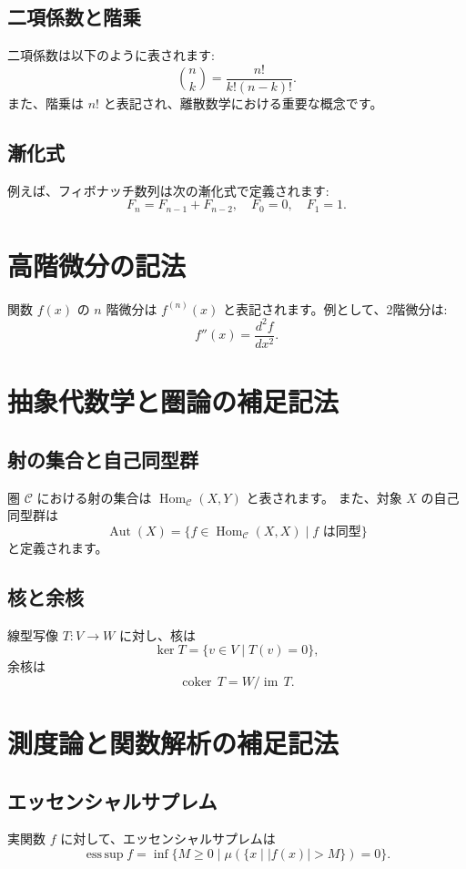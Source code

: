 \documentclass{ltjsarticle} %
\begin{document}
\subsection{二項係数と階乗}
二項係数は以下のように表されます:
\[
  \binom{n}{k} = \frac{n!}{k!(n-k)!}.
\]
また、階乗は \( n! \) と表記され、離散数学における重要な概念です。

\subsection{漸化式}
例えば、フィボナッチ数列は次の漸化式で定義されます:
\[
  F_n = F_{n-1} + F_{n-2}, \quad F_0 = 0,\quad F_1 = 1.
\]

\section{高階微分の記法}
関数 \( f(x) \) の \( n \) 階微分は \( f^{(n)}(x) \) と表記されます。例として、2階微分は:
\[
  f''(x) = \frac{d^2f}{dx^2}.
\]

\section{抽象代数学と圏論の補足記法}
\subsection{射の集合と自己同型群}
圏 \(\mathcal{C}\) における射の集合は \(\operatorname{Hom}_{\mathcal{C}}(X,Y)\) と表されます。  
また、対象 \( X \) の自己同型群は
\[
  \operatorname{Aut}(X) = \{ f \in \operatorname{Hom}_{\mathcal{C}}(X,X) \mid f \text{ は同型} \}
\]
と定義されます。

\subsection{核と余核}
線型写像 \( T: V \to W \) に対し、核は
\[
  \ker T = \{ v \in V \mid T(v) = 0 \},
\]
余核は
\[
  \operatorname{coker}\, T = W / \operatorname{im}\, T.
\]

\section{測度論と関数解析の補足記法}
\subsection{エッセンシャルサプレム}
実関数 \( f \) に対して、エッセンシャルサプレムは
\[
  \operatorname{ess\,sup} f = \inf \{ M \ge 0 \mid \mu(\{x \mid |f(x)| > M\}) = 0 \}.
\]
\end{document}
